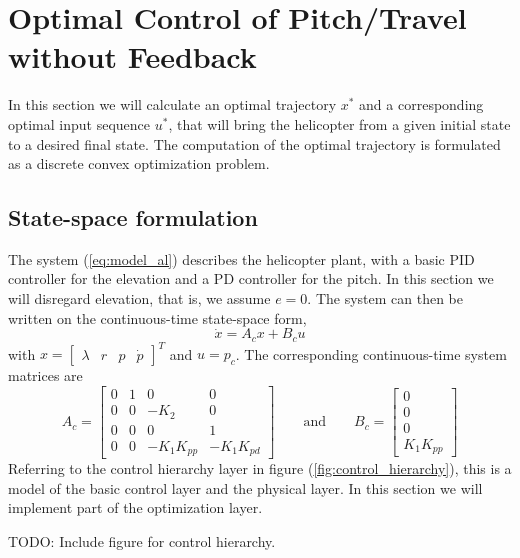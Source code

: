 \section{Optimal Control of Pitch/Travel without Feedback}\label{sec:prob2}

In this section we will calculate an optimal trajectory $x^*$ and a
corresponding optimal input sequence $u^*$, that will bring the helicopter
from a given initial state to a desired final state. The computation of the
optimal trajectory is formulated as a discrete convex optimization problem.

\subsection{State-space formulation}
The system (\ref{eq:model_al}) describes the helicopter plant, with a basic
PID controller for the elevation and a PD controller for the pitch. In this
section we will disregard elevation, that is, we assume $e = 0$. The system
can then be written on the continuous-time state-space form,
\begin{equation}
    \dot{x} = A_cx + B_cu
    \label{eq:state_space_axbu}
\end{equation}
with $x = \begin{bmatrix} \lambda & r & p & \dot{p} \end{bmatrix}^T$ and $u = p_c$.
The corresponding continuous-time system matrices are
\begin{equation}
	A_c = \begin{bmatrix} 0 & 1 & 0 & 0 \\ 0 & 0 & -K_2 & 0 \\ 0 & 0 & 0 & 1 \\ 0 & 0 & -K_1K_{pp} & -K_1K_{pd} \end{bmatrix}
	\qquad\text{and}\qquad
	B_c = \begin{bmatrix}0 \\ 0 \\ 0 \\K_1K_{pp} \end{bmatrix}
\end{equation}
Referring to the control hierarchy layer in figure (\ref{fig:control_hierarchy}),
this is a model of the basic control layer and the physical layer. In this section
we will implement part of the optimization layer.

TODO: Include figure for control hierarchy.

